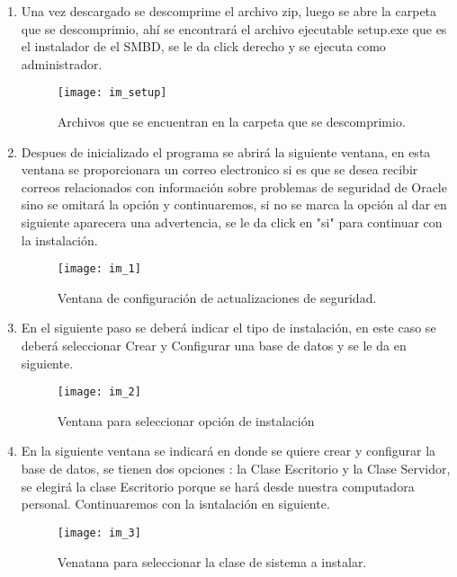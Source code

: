 \documentclass[10pt]{article}
\begin{document}
	\begin{enumerate}
		\item Una vez descargado se descomprime el archivo zip, luego se abre  la carpeta que se descomprimio, ahí se encontrará el archivo ejecutable setup.exe que es el instalador de el SMBD, se le da click derecho y se ejecuta como administrador.\\
		
		\begin{figure}[H]
			\centering
			\texttt{[image: im\_setup]}
			\caption{Archivos que se encuentran en la carpeta que se descomprimio.}
		\end{figure}
		
		
		\item Despues de inicializado el programa se abrirá la siguiente ventana, en esta ventana se proporcionara un correo electronico si es que se desea recibir correos relacionados con información sobre problemas de seguridad de Oracle sino se omitará la opción y continuaremos, si no se marca la opción al dar en siguiente aparecera una advertencia, se le da click en "si" para continuar con la instalación.\\  
		
		\begin{figure}[H]
			\centering
		\texttt{[image: im\_1]}
		\caption{Ventana de configuración de actualizaciones de seguridad.}
	    \end{figure}
		
		\item En el siguiente paso se deberá indicar el tipo de instalación, en este caso se deberá seleccionar Crear y Configurar una base de datos y se le da en siguiente.\\
		
		\begin{figure}[H]
			\centering
		\texttt{[image: im\_2]}
		\caption{Ventana para seleccionar opción de instalación}
		\end{figure}
		
		\item En la siguiente ventana se indicará en donde se quiere crear y configurar la base de datos, se tienen dos opciones : la Clase Escritorio y la Clase Servidor, se elegirá la clase Escritorio porque se hará desde nuestra computadora personal. Continuaremos con la isntalación en siguiente.\\
		
		\begin{figure}[H]
			\centering
			\texttt{[image: im\_3]}
			\caption{Venatana para seleccionar la clase de sistema a instalar. }
		\end{figure}
		

\end{enumerate}
\end{document}
